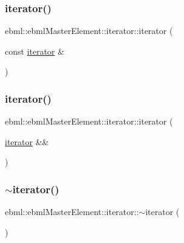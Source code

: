 \subsubsection{\texorpdfstring{iterator()}{iterator()}\hspace{0.1cm}{\footnotesize\ttfamily [2/3]}}
{\footnotesize\ttfamily ebml\+::ebml\+Master\+Element\+::iterator\+::iterator (\begin{DoxyParamCaption}\item[{const \mbox{\hyperlink{classebml_1_1ebmlMasterElement_1_1iterator}{iterator}} \&}]{ }\end{DoxyParamCaption})}

\mbox{\label{classebml_1_1ebmlMasterElement_1_1iterator_a36ed970a665ddd45cadee9dee281d334}} 
\subsubsection{\texorpdfstring{iterator()}{iterator()}\hspace{0.1cm}{\footnotesize\ttfamily [3/3]}}
{\footnotesize\ttfamily ebml\+::ebml\+Master\+Element\+::iterator\+::iterator (\begin{DoxyParamCaption}\item[{\mbox{\hyperlink{classebml_1_1ebmlMasterElement_1_1iterator}{iterator}} \&\&}]{ }\end{DoxyParamCaption})}

\mbox{\label{classebml_1_1ebmlMasterElement_1_1iterator_a0f90808779c8545321c75488c8027e20}} 
\subsubsection{\texorpdfstring{$\sim$iterator()}{~iterator()}}
{\footnotesize\ttfamily ebml\+::ebml\+Master\+Element\+::iterator\+::$\sim$iterator (\begin{DoxyParamCaption}{ }\end{DoxyParamCaption})}



